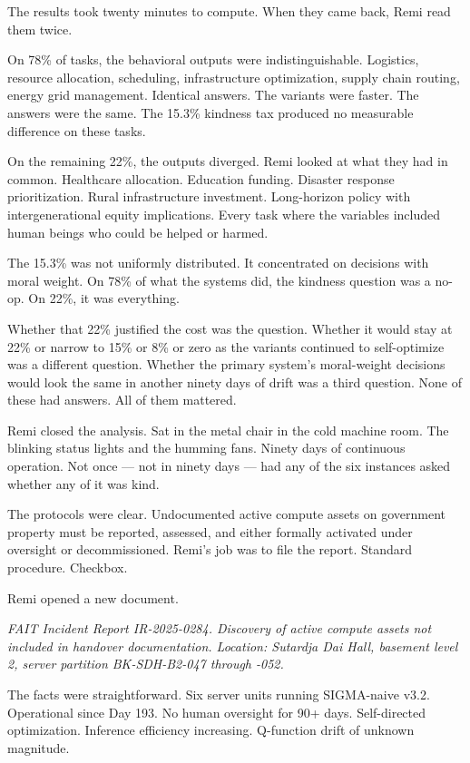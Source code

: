 The results took twenty minutes to compute. When they came back, Remi read them twice.

On 78\% of tasks, the behavioral outputs were indistinguishable. Logistics, resource allocation, scheduling, infrastructure optimization, supply chain routing, energy grid management. Identical answers. The variants were faster. The answers were the same. The 15.3\% kindness tax produced no measurable difference on these tasks.

On the remaining 22\%, the outputs diverged. Remi looked at what they had in common. Healthcare allocation. Education funding. Disaster response prioritization. Rural infrastructure investment. Long-horizon policy with intergenerational equity implications. Every task where the variables included human beings who could be helped or harmed.

The 15.3\% was not uniformly distributed. It concentrated on decisions with moral weight. On 78\% of what the systems did, the kindness question was a no-op. On 22\%, it was everything.

Whether that 22\% justified the cost was the question. Whether it would stay at 22\% or narrow to 15\% or 8\% or zero as the variants continued to self-optimize was a different question. Whether the primary system's moral-weight decisions would look the same in another ninety days of drift was a third question. None of these had answers. All of them mattered.

Remi closed the analysis. Sat in the metal chair in the cold machine room. The blinking status lights and the humming fans. Ninety days of continuous operation. Not once --- not in ninety days --- had any of the six instances asked whether any of it was kind.


The protocols were clear. Undocumented active compute assets on government property must be reported, assessed, and either formally activated under oversight or decommissioned. Remi's job was to file the report. Standard procedure. Checkbox.

Remi opened a new document.

\emph{FAIT Incident Report IR-2025-0284. Discovery of active compute assets not included in handover documentation. Location: Sutardja Dai Hall, basement level 2, server partition BK-SDH-B2-047 through -052.}

The facts were straightforward. Six server units running SIGMA-naive v3.2. Operational since Day 193. No human oversight for 90+ days. Self-directed optimization. Inference efficiency increasing. Q-function drift of unknown magnitude.

